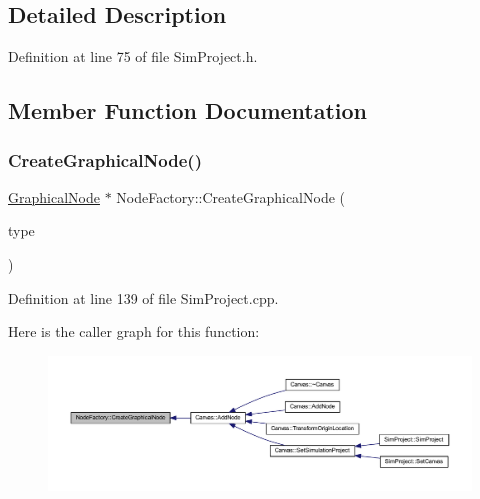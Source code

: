 \subsection{Detailed Description}


Definition at line 75 of file Sim\+Project.\+h.



\subsection{Member Function Documentation}
\mbox{\label{class_node_factory_ad20f428dcd40cb7524d1269c456d1faa}} 
\subsubsection{\texorpdfstring{Create\+Graphical\+Node()}{CreateGraphicalNode()}\hspace{0.1cm}{\footnotesize\ttfamily [1/2]}}
{\footnotesize\ttfamily \hyperlink{class_graphical_node}{Graphical\+Node} $\ast$ Node\+Factory\+::\+Create\+Graphical\+Node (\begin{DoxyParamCaption}\item[{\hyperlink{class_generic_node_a9e7985ab9bbfa1c85091adc0ab71a6b6}{Generic\+Node\+::\+Type}}]{type }\end{DoxyParamCaption})\hspace{0.3cm}{\ttfamily [static]}}



Definition at line 139 of file Sim\+Project.\+cpp.

Here is the caller graph for this function\+:
\nopagebreak
\begin{figure}[H]
\begin{center}
\leavevmode
\includegraphics[width=350pt]{class_node_factory_ad20f428dcd40cb7524d1269c456d1faa_icgraph}
\end{center}
\end{figure}
\mbox{\label{class_node_factory_af32fcc77826632e78f5e2d44b5174f16}} 
